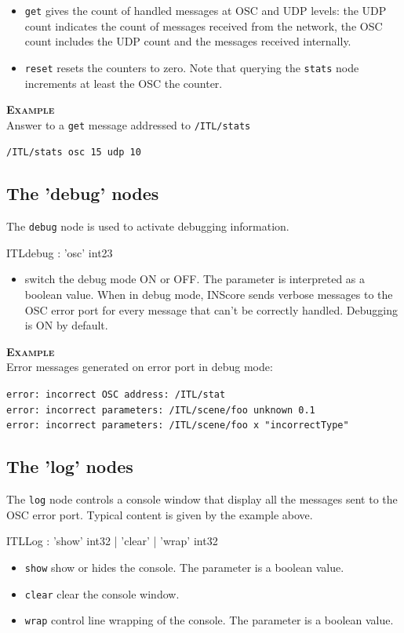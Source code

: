 \documentclass[a4paper,twoside]{report}
\newcommand{\subsublevel}[1]	{\subsection{#1}}
\newcommand{\OSC}[1]		{\texttt{#1}}
\newcommand{\example}		{\textbf{\hspace{-1.5cm}\textbf{\textsc{Example }}}}
\newcommand{\sample}	[1]			{\vspace{-2mm}\begin{center}\colorbox{mygrey}{
								\begin{minipage}[t]{0.9\columnwidth} 
								{\small \texttt{#1}}
								\end{minipage}}\end{center}}
\begin{document}
\begin{itemize}
\item \OSC{get} gives the count of handled messages at OSC and UDP levels: the UDP count indicates the count of messages received from the network, the OSC count includes the UDP count and the messages received internally.
\item \OSC{reset} resets the counters to zero. Note that querying the \OSC{stats} node increments at least the OSC the counter.
\end{itemize}

\example \\
Answer to a \OSC{get} message addressed to \OSC{/ITL/stats}
\sample{/ITL/stats osc 15 udp 10}


\subsublevel{The 'debug' nodes}
\label{ITLdebug}

The \OSC{debug} node is used to activate debugging information.
\begin{rail}
ITLdebug : 'osc' int23
\end{rail}

\begin{itemize}
\item switch the debug mode ON or OFF. The parameter is interpreted as a boolean value. When in debug mode, INScore sends verbose messages to the OSC error port for every message that can't be correctly handled. Debugging is ON by default.
\end{itemize}

\example \\
Error messages generated on error port in debug mode:
\sample{error:  incorrect OSC address: /ITL/stat\\
error:  incorrect parameters: /ITL/scene/foo unknown 0.1\\
error:  incorrect parameters: /ITL/scene/foo x "incorrectType"
}


\subsublevel{The 'log' nodes}
\label{ITLlog}

The \OSC{log} node controls a console window that display all the messages sent to the OSC error port. Typical content is given by the example above.

\begin{rail}
ITLLog : 'show'  int32
		| 'clear'
		| 'wrap' int32
\end{rail}

\begin{itemize}
\item \OSC{show} show or hides the console. The parameter is a boolean value.
\item \OSC{clear} clear the console window.
\item \OSC{wrap} control line wrapping of the console. The parameter is a boolean value.
\end{itemize}
\end{document}
